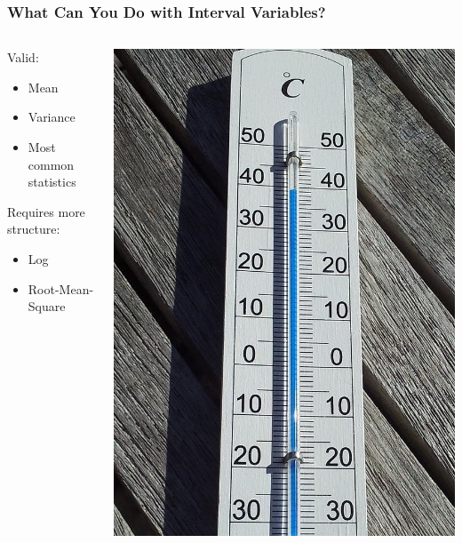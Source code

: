 \documentclass[12pt, block=fill]{beamer}
\begin{document}
\begin{frame}
  \frametitle{What Can You Do with Interval Variables?}



      \begin{columns}
\begin{column}{0.45\textwidth}
Valid:

\begin{itemize}
\item Mean
\item Variance
\item Most common statistics
\end{itemize}

Requires more structure:
\begin{itemize}
\item Log
\item Root-Mean-Square
\end{itemize}



  \end{column}
\begin{column}{0.53\textwidth}
\vspace{.5cm}
\includegraphics[width = \textwidth]{figures/thermometer}
  \end{column}
  \end{columns}

\end{frame}
\end{document}
